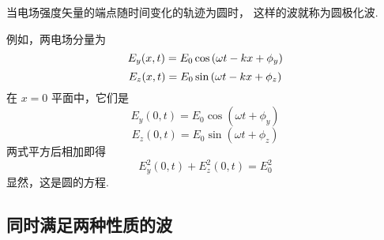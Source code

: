 \documentclass[UTF8,linespread=1.236]{ctexart}
\begin{document}
当电场强度矢量的端点随时间变化的轨迹为圆时，
这样的波就称为圆极化波.

例如，两电场分量为
\begin{equation}
    E_y(x,t) = E_0\cos{(\omega t - kx + \phi_{y})}
\end{equation}
\begin{equation}
    E_z(x,t) = E_0\sin{(\omega t - kx + \phi_{z})}
\end{equation}
在 $x = 0$ 平面中，它们是
\begin{equation}
    E_y(0,t) = E_0\cos{(\omega t + \phi_y)}
\end{equation}
\begin{equation}
    E_z(0,t) = E_0\sin{(\omega t + \phi_z)}
\end{equation}
两式平方后相加即得
\begin{equation}
    E_y^2(0,t) + E_z^2(0,t) = E_0^2
\end{equation}
显然，这是圆的方程.

\subsection{同时满足两种性质的波}


\clearpage
\end{document}
